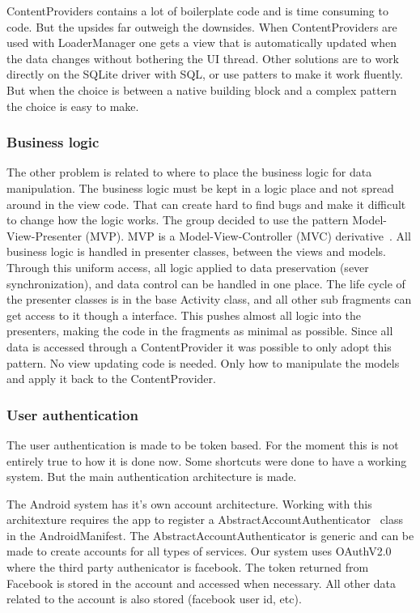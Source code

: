 ContentProviders contains a lot of boilerplate code and is time consuming to code. But the upsides far outweigh the downsides. When ContentProviders are used with LoaderManager one gets a view that is automatically updated when the data changes without bothering the UI thread. Other solutions are to work directly on the SQLite driver with SQL, or use patters to make it work fluently. But when the choice is between a native building block and a complex pattern the choice is easy to make. 

\subsubsection{Business logic}

The other problem is related to where to place the business logic for data manipulation. The business logic must be kept in a logic place and not spread around in the view code. That can create hard to find bugs and make it difficult to change how the logic works.
The group decided to use the pattern Model-View-Presenter (MVP). MVP is a Model-View-Controller (MVC) derivative~\cite{mvc}. All business logic is handled in presenter classes, between the views and models. Through this uniform access, all logic applied to data preservation (sever synchronization), and data control can be handled in one place. The life cycle of the presenter classes is in the base Activity class, and all other sub fragments can get access to it though a interface. 
This pushes almost all logic into the presenters, making the code in the fragments as minimal as possible. Since all data is accessed through a ContentProvider it was possible to only adopt this pattern. No view updating code is needed. Only how to manipulate the models and apply it back to the ContentProvider.


\subsubsection{User authentication}

The user authentication is made to be token based. For the moment this is not entirely true to how it is done now. Some shortcuts were done to have a working system. But the main authentication architecture is made.

The Android system has it's own account architecture. Working with this architexture requires the app to register a AbstractAccountAuthenticator~\cite{androidAccount} class in the AndroidManifest. The AbstractAccountAuthenticator is generic and can be made to create accounts for all types of services. Our system uses OAuthV2.0 where the third party authenicator is facebook. The token returned from Facebook is stored in the account and accessed when necessary. All other data related to the account is also stored (facebook user id, etc).

